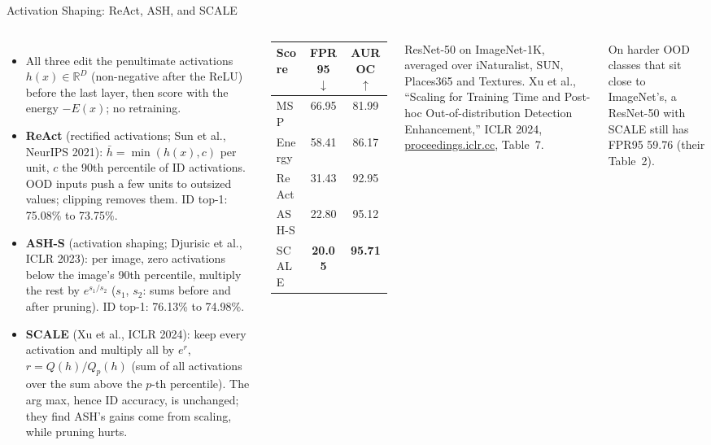 \begin{frame}{Activation Shaping: ReAct, ASH, and SCALE}
  \begin{columns}[T,onlytextwidth]
      \begin{itemize}\footnotesize\itemsep0.3em
        \item All three edit the penultimate activations $h(x)\in\mathbb{R}^D$ (non-negative after the ReLU) before the last layer, then score with the energy $-E(x)$; no retraining.
        \item \textbf{ReAct} (rectified activations; Sun et al., NeurIPS 2021): $\bar h=\min(h(x),c)$ per unit, $c$ the 90th percentile of ID activations. OOD inputs push a few units to outsized values; clipping removes them. ID top-1: 75.08\% to 73.75\%.
        \item \textbf{ASH-S} (activation shaping; Djurisic et al., ICLR 2023): per image, zero activations below the image's 90th percentile, multiply the rest by $e^{s_1/s_2}$ ($s_1$, $s_2$: sums before and after pruning). ID top-1: 76.13\% to 74.98\%.
        \item \textbf{SCALE} (Xu et al., ICLR 2024): keep every activation and multiply all by $e^{r}$, $r=Q(h)/Q_p(h)$ (sum of all activations over the sum above the $p$-th percentile). The arg max, hence ID accuracy, is unchanged; they find ASH's gains come from scaling, while pruning hurts.
      \end{itemize}
      \centering
      \vspace{0.4em}
      {\centering\footnotesize
      \begin{tabular}{lcc}
        \toprule
        \textbf{Score} & \textbf{FPR95} $\downarrow$ & \textbf{AUROC} $\uparrow$ \\
        \midrule
        MSP & 66.95 & 81.99 \\
        Energy & 58.41 & 86.17 \\
        ReAct & 31.43 & 92.95 \\
        ASH-S & 22.80 & 95.12 \\
        SCALE & \textbf{20.05} & \textbf{95.71} \\
        \bottomrule
      \end{tabular}\par}
      \vspace{0.4em}
      {\scriptsize ResNet-50 on ImageNet-1K, averaged over iNaturalist, SUN, Places365 and Textures. Xu et al., ``Scaling for Training Time and Post-hoc Out-of-distribution Detection Enhancement,'' ICLR 2024, \href{https://proceedings.iclr.cc/paper_files/paper/2024/hash/46d943bc6a15a57c923829efc0db7c7a-Abstract-Conference.html}{proceedings.iclr.cc}, Table~7.\par}
      \vspace{0.6em}
      {\scriptsize On harder OOD classes that sit close to ImageNet's, a ResNet-50 with SCALE still has FPR95 59.76 (their Table~2).\par}
  \end{columns}
\end{frame}


